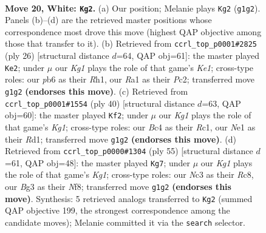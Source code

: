 \documentclass[11pt]{article}
\begin{document}
\clearpage

\begin{figure}[p]\centering
\begin{subfigure}{0.46\textwidth}\centering
\resizebox{\linewidth}{!}{%
\newchessgame
\chessboard[
  setfen={rnbr2k1/5p2/1p2pn2/2b4p/p1B1P3/2N3BP/PP3P2/R1R1N1K1 w - - 0 20},
  showmover=false,
  pgfstyle=straightmove, color=movearrow, markmove={g1-g2}
]}
\caption{}
\end{subfigure}\hfill
\begin{subfigure}{0.46\textwidth}\centering
\resizebox{\linewidth}{!}{%
\newchessgame
\chessboard[
  setfen={r1br2k1/p3bppp/1p3n2/4p3/4P3/P1NBB2P/1PP3P1/R3K2R w KQ - 0 14},
  showmover=false,
  pgfstyle=straightmove, color=movearrow, markmove={e1-e2}
]}
\caption{}
\end{subfigure}
\\[4pt]
\begin{subfigure}{0.46\textwidth}\centering
\resizebox{\linewidth}{!}{%
\newchessgame
\chessboard[
  setfen={r3k2r/1pb2p2/1np1p3/p3Pb1p/8/2B2BP1/PP1NP2P/2RR2K1 w kq - 0 21},
  showmover=false,
  pgfstyle=straightmove, color=movearrow, markmove={g1-f2}
]}
\caption{}
\end{subfigure}\hfill
\begin{subfigure}{0.46\textwidth}\centering
\resizebox{\linewidth}{!}{%
\newchessgame
\chessboard[
  setfen={r1r2nk1/1p2pn2/4pb1p/p5p1/P5P1/2PB1NB1/1P2R2P/5RK1 b - - 1 28},
  showmover=false,
  pgfstyle=straightmove, color=movearrow, markmove={g8-g7}
]}
\caption{}
\end{subfigure}
\caption{\textbf{Move 20, White: \texttt{Kg2}.} (a) Our position; Melanie plays \texttt{Kg2} (\texttt{g1g2}). Panels (b)--(d) are the retrieved master positions whose correspondence most drove this move (highest QAP objective among those that transfer to it). (b) Retrieved from \texttt{ccrl\_top\_p0001\#2825} (ply 26) [structural distance $d$=64, QAP obj=61]: the master played \texttt{Ke2}; under $\mu$ our \emph{Kg1} plays the role of that game's \emph{Ke1}; cross-type roles: our \emph{p}b6 as their \emph{R}h1, our \emph{R}a1 as their \emph{P}c2; transferred move \texttt{g1g2} \textbf{(endorses this move)}. (c) Retrieved from \texttt{ccrl\_top\_p0001\#1554} (ply 40) [structural distance $d$=63, QAP obj=60]: the master played \texttt{Kf2}; under $\mu$ our \emph{Kg1} plays the role of that game's \emph{Kg1}; cross-type roles: our \emph{B}c4 as their \emph{R}c1, our \emph{N}e1 as their \emph{R}d1; transferred move \texttt{g1g2} \textbf{(endorses this move)}. (d) Retrieved from \texttt{ccrl\_top\_p0000\#1304} (ply 55) [structural distance $d$=61, QAP obj=48]: the master played \texttt{Kg7}; under $\mu$ our \emph{Kg1} plays the role of that game's \emph{Kg1}; cross-type roles: our \emph{N}c3 as their \emph{R}c8, our \emph{B}g3 as their \emph{N}f8; transferred move \texttt{g1g2} \textbf{(endorses this move)}. Synthesis: 5 retrieved analogs transferred to \texttt{Kg2} (summed QAP objective 199, the strongest correspondence among the candidate moves); Melanie committed it via the \texttt{search} selector.}
\label{fig:thought-m38}
\end{figure}
\end{document}
